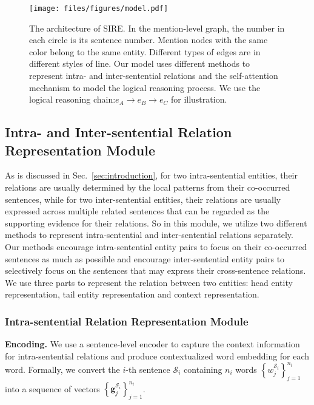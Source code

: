 \documentclass[11pt,a4paper]{article}
\begin{document}
\begin{figure*}
    \centering
    \texttt{[image: files/figures/model.pdf]}
    \caption{The architecture of SIRE. In the mention-level graph, the number in each circle is its sentence number. Mention nodes with the same color belong to the same entity. Different types of edges are in different styles of line. Our model uses different methods to represent intra- and inter-sentential relations and the self-attention mechanism to model the logical reasoning process. We use the logical reasoning chain:$e_A\rightarrow e_B\rightarrow e_C$ for illustration.}
    \label{fig:model}
\end{figure*}

\subsection{Intra- and Inter-sentential Relation Representation Module \label{ssec:intra-inter}}
As is discussed in Sec.~\ref{sec:introduction}, for two intra-sentential entities, their relations are usually determined by the local patterns from their co-occurred sentences, while for two inter-sentential entities, their relations are usually expressed across multiple related sentences that can be regarded as the supporting evidence for their relations. So in this module, we utilize two different methods to represent intra-sentential and inter-sentential relations separately. Our methods encourage intra-sentential entity pairs to focus on their co-occurred sentences as much as possible and encourage inter-sentential entity pairs to selectively focus on the sentences that may express their cross-sentence relations. We use three parts to represent the relation between two entities: head entity representation, tail entity representation and context representation.

\subsubsection{Intra-sentential Relation Representation Module\label{sssec:intra}}


\textbf{Encoding.} We use a sentence-level encoder to capture the context information for intra-sentential relations and produce contextualized word embedding for each word. Formally, we convert the $i$-th sentence $\mathcal{S}_{i}$ containing $n_i$ words $\left\{w^{\mathcal{S}_{i}}_j\right\}^{n_i}_{j=1}$ into a sequence of vectors $\left\{\textbf{g}^{\mathcal{S}_{i}}_{j}\right\}^{n_i}_{j=1}$.
\end{document}
